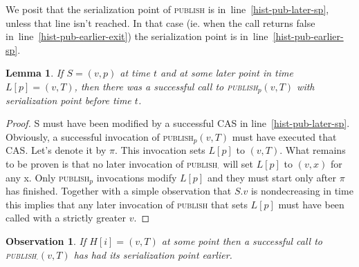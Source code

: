 \documentclass[a4paper,11pt]{article}
\newtheorem{lemma}{Lemma}
\newtheorem{observation}{Observation}
\newcommand{\fn}[1]{\textsc{#1}}
\begin{document}


We posit that the serialization point of \fn{publish} is in~line~\ref{hist-pub-later-sp}, unless that line isn't reached. In that case (ie. when the call returns false in~line~\ref{hist-pub-earlier-exit})
the serialization point is in~line~\ref{hist-pub-earlier-sp}.


\begin{lemma}\label{hist-cv-latest}
If $S = (v, p)$ at time $t$ and at some later point in time $L[p] = (v, T)$, then there was a successful call to \fn{publish$_p$}$(v, T)$ with serialization point before time $t$.
\end{lemma}
\begin{proof}
S must have been modified by a successful CAS in line~\ref{hist-pub-later-sp}. Obviously, a successful invocation of \fn{publish$_p$}$(v, T)$ must have executed that CAS. Let's denote it by $\pi$.
This invocation sets $L[p]$ to $(v, T)$. What remains to be proven is that no later invocation of \fn{publish$_\cdot$} will set $L[p]$ to $(v, x)$ for any x.
Only \fn{publish$_p$} invocations modify $L[p]$ and they must start only after $\pi$ has finished. Together with a simple observation that $S.v$ is nondecreasing in time this implies
that any later invocation of \fn{publish} that sets $L[p]$ must have been called with a strictly greater $v$.
\end{proof}

\begin{observation}
\label{obs-hist-is-correct}
If $H[i] = (v, T)$ at some point then a successful call to \fn{publish$_\cdot$}$(v, T)$ has had its serialization point earlier.
\end{observation}
\end{document}
